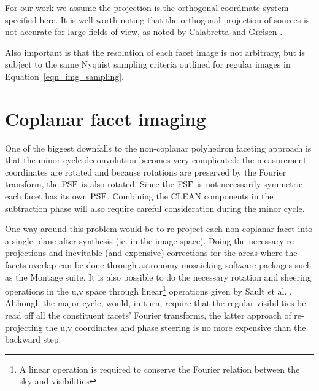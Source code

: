For our work we assume the projection is the orthogonal coordinate system specified here. It is well worth noting 
that the orthogonal projection of sources is not accurate for large fields of view, as noted by Calabretta and Greisen 
\cite{calabretta2002representations}.

Also important is that the resolution of each facet image is not arbitrary, but is subject to the same Nyquist sampling 
criteria outlined for regular images in Equation~\ref{eqn_img_sampling}.
\section{Coplanar facet imaging}
One of the biggest downfalls to the non-coplanar polyhedron faceting approach is that the minor cycle deconvolution becomes very complicated: the measurement
coordinates are rotated and because rotations are preserved by the Fourier transform, the $\textrm{PSF}$ is also rotated. Since the $\textrm{PSF}$ is not necessarily 
symmetric each facet has its own $\textrm{PSF}$. Combining the CLEAN components in the subtraction phase will also require careful consideration during the minor cycle.

One way around this problem would be to re-project each non-coplanar facet into a single plane after synthesis (ie. in the image-space). Doing the necessary
re-projections and inevitable (and expensive) corrections for the areas where the facets overlap can be done through astronomy mosaicking software packages such as the
Montage \cite{jacob2004montage} suite. It is also possible to do the necessary rotation and sheering operations in the u,v space through 
linear\footnote{A linear operation is required to conserve the Fourier relation between the sky and visibilities} operations given by 
Sault et al. \cite[Appendix A]{sault1996approach}. Although the major cycle, would, in turn, require that the regular visibilities be read off all
the constituent facets' Fourier transforms, the latter approach of re-projecting the u,v coordinates and phase steering is no more expensive than the backward 
step.

